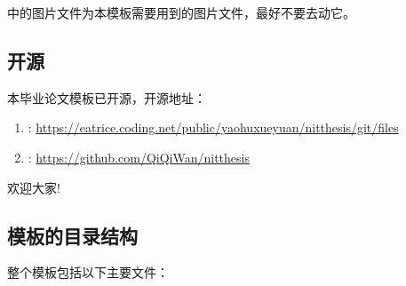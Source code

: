 \documentclass{nitthesis}
\begin{document}
中的图片文件为本模板需要用到的图片文件，最好不要去动它。

\subsection{开源}

本毕业论文模板已开源，开源地址：

\begin{enumerate}
    \item {}: \href{https://eatrice.coding.net/public/yaohuxueyuan/nitthesis/git/files}{https://eatrice.coding.net/public/yaohuxueyuan/nitthesis/git/files}
    \item {}: \href{https://github.com/QiQiWan/nitthesis}{https://github.com/QiQiWan/nitthesis}
\end{enumerate}

欢迎大家!

\subsection{模板的目录结构}

整个模板包括以下主要文件：
\end{document}
